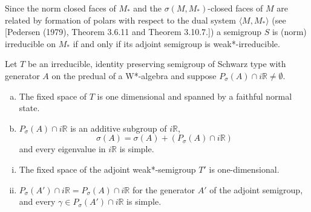 Since the norm closed faces of $M_{*}$ and the $\sigma(M,M_{*})$-closed faces of $M$ are related by formation of polars with respect to the dual system $\langle M,M_{*} \rangle$ (see [Pedersen (1979), Theorem 3.6.11 and Theorem 3.10.7.]) a semigroup $S$ is (norm) irreducible on $M_{*}$ if and only if its adjoint semigroup is weak*-irreducible.

\begin{theorem}\label{thm:d3-1-10}
Let $T$ be an irreducible, identity preserving semigroup of Schwarz type with generator $A$ on the predual of a W*-algebra and suppose $P_{\sigma}(A) \cap i\mathbb{R} \neq \emptyset$.

\begin{enumerate}[(a)]
\item The fixed space of $T$ is one dimensional and spanned by a faithful normal state.

\item $P_{\sigma}(A) \cap i\mathbb{R}$ is an additive subgroup of $i\mathbb{R}$,
\[
\sigma(A) = \sigma(A) + (P_{\sigma}(A) \cap i\mathbb{R})
\]
and every eigenvalue in $i\mathbb{R}$ is simple.
\end{enumerate}

\begin{enumerate}[(i)]
\item The fixed space of the adjoint weak*-semigroup $T'$ is one-dimensional.

\item $P_{\sigma}(A') \cap i\mathbb{R} = P_{\sigma}(A) \cap i\mathbb{R}$ for the generator $A'$ of the adjoint semigroup, and every $\gamma \in P_{\sigma}(A') \cap i\mathbb{R}$ is simple.
\end{enumerate}
\end{theorem}

